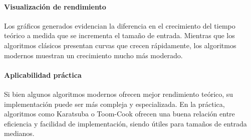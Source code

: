 \paragraph{Visualización de rendimiento} 
Los gráficos generados evidencian la diferencia en el crecimiento del tiempo teórico a medida que se incrementa el tamaño de entrada. Mientras que los algoritmos clásicos presentan curvas que crecen rápidamente, los algoritmos modernos muestran un crecimiento mucho más moderado.

\paragraph{Aplicabilidad práctica} 
Si bien algunos algoritmos modernos ofrecen mejor rendimiento teórico, su implementación puede ser más compleja y especializada. En la práctica, algoritmos como Karatsuba o Toom-Cook ofrecen una buena relación entre eficiencia y facilidad de implementación, siendo útiles para tamaños de entrada medianos.
